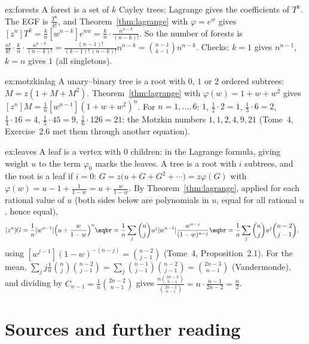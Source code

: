 \begin{solution}{ex:forests}
\idea A forest is a set of $k$ Cayley trees; Lagrange gives the coefficients of $T^k$.
\writeup The EGF is $\frac{T^k}{k!}$, and Theorem~\ref{thm:lagrange} with $\varphi=e^w$ gives $[z^n]T^k=\frac kn[w^{n-k}]e^{nw}=\frac kn\cdot\frac{n^{n-k}}{(n-k)!}$. So the number of forests is
$\frac{n!}{k!}\cdot\frac kn\cdot\frac{n^{n-k}}{(n-k)!}=\frac{(n-1)!}{(k-1)!\,(n-k)!}n^{n-k}=\binom{n-1}{k-1}n^{n-k}$. Checks: $k=1$ gives $n^{n-1}$, $k=n$ gives $1$ (all singletons).
\end{solution}

\begin{solution}{ex:motzkinlag}
\idea A unary--binary tree is a root with $0$, $1$ or $2$ ordered subtrees: $M=z(1+M+M^2)$.
\writeup Theorem~\ref{thm:lagrange} with $\varphi(w)=1+w+w^2$ gives $[z^n]M=\frac1n[w^{n-1}](1+w+w^2)^n$. For $n=1,\dots,6$: $1$, $\frac12\cdot2=1$, $\frac13\cdot6=2$, $\frac14\cdot16=4$, $\frac15\cdot45=9$,
$\frac16\cdot126=21$: the Motzkin numbers $1,1,2,4,9,21$ (Tome~4, Exercise~2.6 met them through another equation).
\end{solution}

\begin{solution}{ex:leaves}
\idea A leaf is a vertex with $0$ children: in the Lagrange formula, giving weight $u$ to the term $\varphi_0$ marks the leaves.
\writeup A tree is a root with $i$ subtrees, and the root is a leaf if $i=0$: $G=z\big(u+G+G^2+\cdots\big)=z\varphi(G)$ with $\varphi(w)=u-1+\frac1{1-w}=u+\frac w{1-w}$. By
Theorem~\ref{thm:lagrange}, applied for each rational value of $u$ (both sides below are polynomials in $u$, equal for all rational $u$, hence equal),
\[
\begin{aligned}{}&[z^n]G=\frac1n[w^{n-1}]\Big(u+\frac w{1-w}\Big)^n\eqbr=\frac1n\sum_j\binom nju^j[w^{n-1}]\frac{w^{n-j}}{(1-w)^{n-j}}\eqbr=\frac1n\sum_j\binom nju^j\binom{n-2}{j-1},\end{aligned}
\]
using $[w^{j-1}](1-w)^{-(n-j)}=\binom{n-2}{j-1}$ (Tome~4, Proposition~2.1). For the mean, $\sum_jj\frac1n\binom nj\binom{n-2}{j-1}=\sum_j\binom{n-1}{j-1}\binom{n-2}{j-1}=\binom{2n-3}{n-1}$ (Vandermonde), and
dividing by $C_{n-1}=\frac1n\binom{2n-2}{n-1}$ gives $\frac{n\binom{2n-3}{n-1}}{\binom{2n-2}{n-1}}=n\cdot\frac{n-1}{2n-2}=\frac n2$.
\end{solution}

\section*{Sources and further reading}

